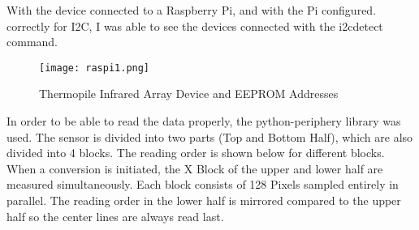 \documentclass[thesis]{deutez}
\begin{document}
With the device connected to a Raspberry Pi, and with the Pi configured.\cite{adaf} correctly for I2C, I was able to see the devices connected with the i2cdetect command.
\begin{figure}[h!]
	\centering
	\texttt{[image: raspi1.png]}
	\caption{Thermopile Infrared Array Device and EEPROM Addresses}
\end{figure}
\FloatBarrier

In order to be able to read the data properly, the python-periphery\cite{perip} library was used. The sensor is divided into two parts (Top and Bottom Half), which are also divided into 4 blocks. The reading order is shown below for different blocks. When a conversion is initiated, the X Block of the upper and lower half are measured simultaneously. Each block consists of 128 Pixels sampled entirely in parallel. The reading order in the lower half is mirrored compared to the upper half so the center lines are always read last.
\end{document}
